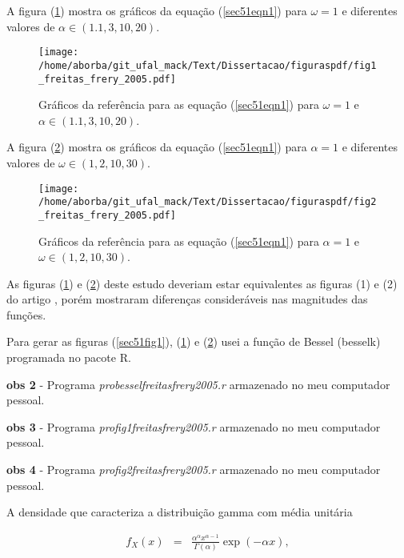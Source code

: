 \documentclass[10pt,a4paper]{article}
\begin{document}
A figura (\ref{sec51fig2}) mostra os gráficos da equação (\ref{sec51eqn1}) para $\omega=1$ e diferentes valores de $\alpha\in(1.1,3,10,20)$. 

\begin{figure}[!htb]
\centering
\texttt{[image: /home/aborba/git\_ufal\_mack/Text/Dissertacao/figuraspdf/fig1\_freitas\_frery\_2005.pdf]}
	\caption{Gráficos da referência \cite{freitas_frery_2005} para as equação (\ref{sec51eqn1}) para $\omega=1$ e $\alpha\in(1.1,3,10,20)$.}
\label{sec51fig2}
\end{figure}

A figura (\ref{sec51fig3}) mostra os gráficos da equação (\ref{sec51eqn1}) para $\alpha=1$ e diferentes valores de $\omega\in(1,2,10,30)$. 

\begin{figure}[!htb]
\centering
\texttt{[image: /home/aborba/git\_ufal\_mack/Text/Dissertacao/figuraspdf/fig2\_freitas\_frery\_2005.pdf]}
	\caption{Gráficos da referência \cite{freitas_frery_2005} para as equação (\ref{sec51eqn1}) para $\alpha=1$ e $\omega\in(1,2,10,30)$.}
\label{sec51fig3}
\end{figure}

	
As figuras (\ref{sec51fig2}) e (\ref{sec51fig3}) deste estudo deveriam estar equivalentes as figuras (1) e (2) do artigo \cite{freitas_frery_2005}, porém mostraram diferenças consideráveis nas magnitudes das funções. 

Para gerar as figuras (\ref{sec51fig1}), (\ref{sec51fig2}) e (\ref{sec51fig3}) usei a função de Bessel (besselk) programada no pacote R.

{\bf obs 2} - Programa {\it probesselfreitasfrery2005.r} armazenado no meu computador pessoal.

{\bf obs 3} - Programa {\it profig1freitasfrery2005.r} armazenado no meu computador pessoal.

{\bf obs 4} - Programa {\it profig2freitasfrery2005.r} armazenado no meu computador pessoal.

A densidade que caracteriza a distribuição gamma com média unitária

\begin{equation}\label{sec51eqn2}
\begin{array}{ccc}
	f_{X}(x)&=&\frac{\alpha^{\alpha}x^{\alpha-1}}{\Gamma(\alpha)}\exp\left(-\alpha x\right), \\
\end{array}
\end{equation}
\end{document}
